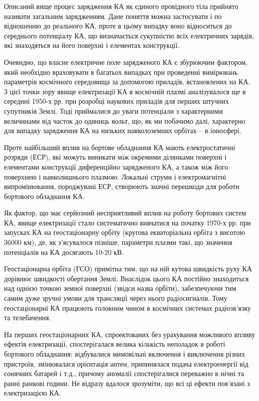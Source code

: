 \documentclass[a4paper,12pt]{article}
\begin{document}
Описаний вище процес зарядження КА як єдиного провідного тіла прийнято називати загальним зарядженням. Дане поняття можна застосувати і по відношенню до реального КА, проте в цьому випадку воно відноситься до середнього потенціалу КА, що визначається сукупністю всіх електричних зарядів, які знаходяться на його поверхні і елементах конструкції.

Очевидно, що власне електричне поле зарядженого КА є збурюючим фактором, який необхідно враховувати в багатьох випадках при проведенні вимірювань параметрів космічного середовища за допомогою приладів, встановлених на КА. З цієї точки зору явище електризації КА в космічній плазмі аналізувалося ще в середині 1950-х рр. при розробці наукових приладів для перших штучних супутників Землі. Тоді приймалися до уваги потенціали з характерними величинами від часток до одиниць вольт, що, як ми побачимо далі, характерно для випадку зарядження КА на низьких навколоземних орбітах -- в іоносфері.

Проте найбільший вплив на бортове обладнання КА мають електростатичні розряди (ЕСР), які можуть виникати між окремими ділянками поверхні і елементами конструкції диференційно зарядженого КА, а також між його поверхнею і навколишнього плазмою. Локальні струми і електромагнітні випромінювання, породжувані ЕСР, створюють значні перешкоди для роботи бортового обладнання КА.

Як фактор, що має серйозний несприятливий вплив на роботу бортових систем КА, явище електризації стало систематично вивчатися на початку 1970-х рр. при запусках КА на геостаціонарну орбіту (кругова екваторіальна орбіта з висотою ~ 36000 км), де, як з'ясувалося пізніше, параметри плазми такі, що значення потенціалів на КА досягають 10-20 кВ.

Геостаціонарна орбіта (ГСО) примітна тим, що на ній кутова швидкість руху КА дорівнює швидкості обертання Землі. Внаслідок цього КА постійно знаходиться над однією точкою земної поверхні (звідси назва орбіти), забезпечуючи тим самим дуже зручні умови для трансляції через нього радіосигналів. Тому геостаціонарні КА працюють головним чином в космічних системах радіозв'язку та телебачення.

На перших геостаціонарних КА, спроектованих без урахування можливого впливу ефектів електризації, спостерігалася велика кількість неполадок в роботі бортового обладнання: відбувалися мимовільні включення і виключення різних пристроїв, змінювалася орієнтація антен, припинялася подача електроенергії від сонячних батарей і т.д., причому аномалії спостерігалися переважно в нічні та ранні ранкові години. Не відразу вдалося зрозуміти, що всі ці ефекти пов'язані з електризацією КА.
\end{document}

